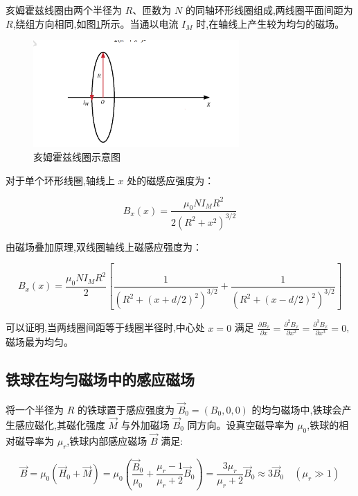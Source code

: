 \documentclass[UTF8]{ctexart}
\begin{document}
    亥姆霍兹线圈由两个半径为 $R$、匝数为 $N$ 的同轴环形线圈组成,两线圈平面间距为 $R$,绕组方向相同,如图\ref{fig:helmholtz_coil}所示。当通以电流 $I_M$ 时,在轴线上产生较为均匀的磁场。
    
    \begin{figure}[htbp]
    \centering
    \includegraphics[width=0.7\textwidth]{helmholtz_coil.png}
    \caption{亥姆霍兹线圈示意图}
    \label{fig:helmholtz_coil}
    \end{figure}
    
    对于单个环形线圈,轴线上 $x$ 处的磁感应强度为：
    
    \begin{equation}
    B_x(x) = \frac{\mu_0 N I_M R^2}{2(R^2+x^2)^{3/2}}
    \end{equation}
    
    由磁场叠加原理,双线圈轴线上磁感应强度为：
    
    \begin{equation}
    B_x(x) = \frac{\mu_0 N I_M R^2}{2} \left[ \frac{1}{(R^2+(x+d/2)^2)^{3/2}} + \frac{1}{(R^2+(x-d/2)^2)^{3/2}} \right]
    \end{equation}
    
    可以证明,当两线圈间距等于线圈半径时,中心处 $x=0$ 满足 $\frac{\partial B_x}{\partial x}=\frac{\partial^2 B_x}{\partial x^2}=\frac{\partial^3 B_x}{\partial x^3}=0$,磁场最为均匀。
    
    \subsection{铁球在均匀磁场中的感应磁场}
    
    将一个半径为 $R$ 的铁球置于感应强度为 $\vec{B}_0=(B_0,0,0)$ 的均匀磁场中,铁球会产生感应磁化,其磁化强度 $\vec{M}$ 与外加磁场 $\vec{B}_0$ 同方向。设真空磁导率为 $\mu_0$,铁球的相对磁导率为 $\mu_r$,铁球内部感应磁场 $\vec{B}$ 满足:
    
    \begin{equation}
    \vec{B} = \mu_0(\vec{H}_0+\vec{M}) = \mu_0\left(\frac{\vec{B}_0}{\mu_0}+\frac{\mu_r-1}{\mu_r+2}\vec{B}_0\right) = \frac{3\mu_r}{\mu_r+2}\vec{B}_0 \approx 3\vec{B}_0 \quad (\mu_r \gg 1)
    \end{equation}
    
\end{document}
